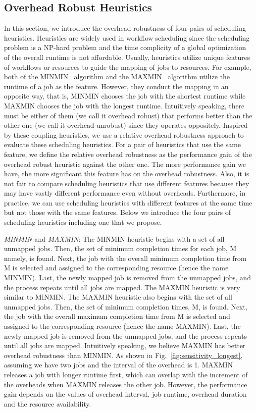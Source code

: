 \subsection{Overhead Robust Heuristics}
\label{sec:heuristics}
In this section, we introduce the overhead robustness of four pairs of scheduling heuristics. Heuristics are widely used in workflow scheduling since the scheduling problem is a NP-hard problem and the time complicity of a global optimization of the overall runtime is not affordable. Usually, heuristics utilize unique features of workflows or resources to guide the mapping of jobs to resources. For example, both of the MINMIN~\cite{Blythe2005} algorithm and the MAXMIN~\cite{Braun2001} algorithm utilize the runtime of a job as the feature. However, they conduct the mapping in an opposite way, that is, MINMIN chooses the job with the shortest runtime while MAXMIN chooses the job with the longest runtime. Intuitively speaking, there must be either of them (we call it overhead robust) that performs better than the other one (we call it overhead unrobust) since they operates oppositely. Inspired by these coupling heuristics, we use a relative overhead robustness approach to evaluate these scheduling heuristics. For a pair of heuristics that use the same feature, we define the relative overhead robustness as the performance gain of the overhead robust heuristic against the other one. The more performance gain we have, the more significant this feature has on the overhead robustness. Also, it is not fair to compare scheduling heuristics that use different features because they may have vastly different performance even without overheads. Furthermore, in practice, we can use scheduling heuristics with different features at the same time but not those with the same features. 
Below we introduce the four pairs of scheduling heuristics including one that we propose. 


\emph{MINMIN} and \emph{MAXMIN}: The MINMIN heuristic begins with a set of all unmapped jobs. Then, the set of minimum completion times for each job, M namely, is found. Next, the job with the overall minimum completion time from M is selected and assigned to the corresponding resource (hence the name MINMIN). Last, the newly mapped job is removed from the unmapped jobs, and the process repeats until all jobs are mapped. 
The MAXMIN heuristic is very similar to MINMIN. The MAXMIN heuristic also begins with the set of all unmapped jobs. Then, the set of minimum completion times, M, is found. Next, the job with the overall maximum completion time from M is selected and assigned to the corresponding resource (hence the name MAXMIN). Last, the newly mapped job is removed from the unmapped jobs, and the process repeats until all jobs are mapped. 
Intuitively speaking, we believe MAXMIN has better overhead robustness than MINMIN. As shown in Fig.~\ref{fig:sensitivity_longest}, assuming we have two jobs and the interval of the overhead is 1. MAXMIN releases a job with longer runtime first, which can overlap with the increment of the overheads when MAXMIN releases the other job. However, the performance gain depends on the values of overhead interval, job runtime, overhead duration and the resource availability. 

